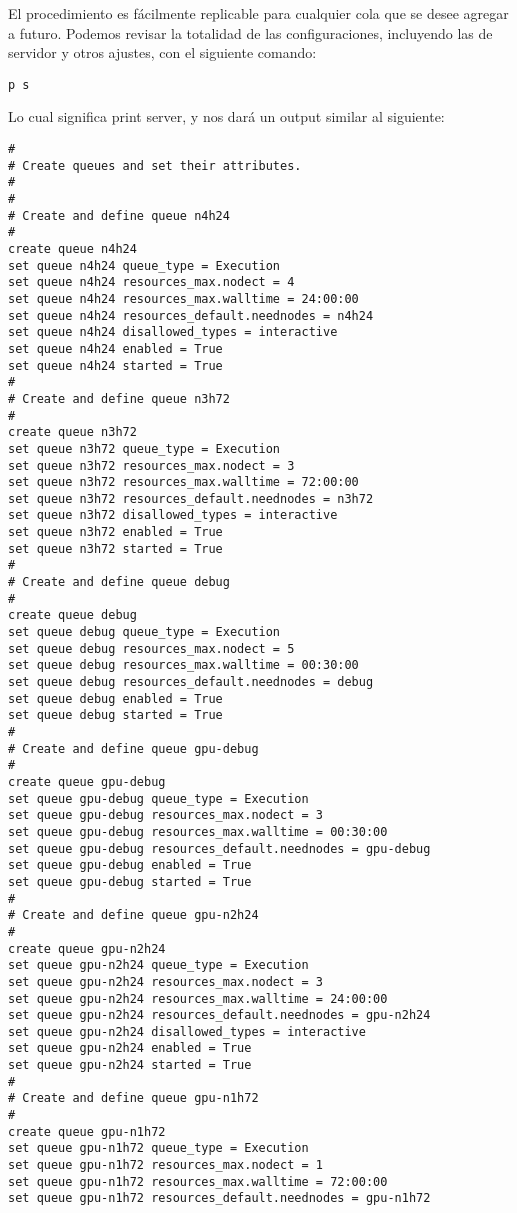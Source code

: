 El procedimiento es fácilmente replicable para cualquier cola que se desee agregar a futuro. Podemos revisar la totalidad de las configuraciones, incluyendo las de servidor y otros ajustes, con el siguiente comando:

\begin{lstlisting}
p s
\end{lstlisting}

Lo cual significa print server, y nos dará un output similar al siguiente:

\begin{lstlisting}
#
# Create queues and set their attributes.
#
#
# Create and define queue n4h24
#
create queue n4h24
set queue n4h24 queue_type = Execution
set queue n4h24 resources_max.nodect = 4
set queue n4h24 resources_max.walltime = 24:00:00
set queue n4h24 resources_default.neednodes = n4h24
set queue n4h24 disallowed_types = interactive
set queue n4h24 enabled = True
set queue n4h24 started = True
#
# Create and define queue n3h72
#
create queue n3h72
set queue n3h72 queue_type = Execution
set queue n3h72 resources_max.nodect = 3
set queue n3h72 resources_max.walltime = 72:00:00
set queue n3h72 resources_default.neednodes = n3h72
set queue n3h72 disallowed_types = interactive
set queue n3h72 enabled = True
set queue n3h72 started = True
#
# Create and define queue debug
#
create queue debug
set queue debug queue_type = Execution
set queue debug resources_max.nodect = 5
set queue debug resources_max.walltime = 00:30:00
set queue debug resources_default.neednodes = debug
set queue debug enabled = True
set queue debug started = True
#
# Create and define queue gpu-debug
#
create queue gpu-debug
set queue gpu-debug queue_type = Execution
set queue gpu-debug resources_max.nodect = 3
set queue gpu-debug resources_max.walltime = 00:30:00
set queue gpu-debug resources_default.neednodes = gpu-debug
set queue gpu-debug enabled = True
set queue gpu-debug started = True
#
# Create and define queue gpu-n2h24
#
create queue gpu-n2h24
set queue gpu-n2h24 queue_type = Execution
set queue gpu-n2h24 resources_max.nodect = 3
set queue gpu-n2h24 resources_max.walltime = 24:00:00
set queue gpu-n2h24 resources_default.neednodes = gpu-n2h24
set queue gpu-n2h24 disallowed_types = interactive
set queue gpu-n2h24 enabled = True
set queue gpu-n2h24 started = True
#
# Create and define queue gpu-n1h72
#
create queue gpu-n1h72
set queue gpu-n1h72 queue_type = Execution
set queue gpu-n1h72 resources_max.nodect = 1
set queue gpu-n1h72 resources_max.walltime = 72:00:00
set queue gpu-n1h72 resources_default.neednodes = gpu-n1h72

\end{lstlisting}
